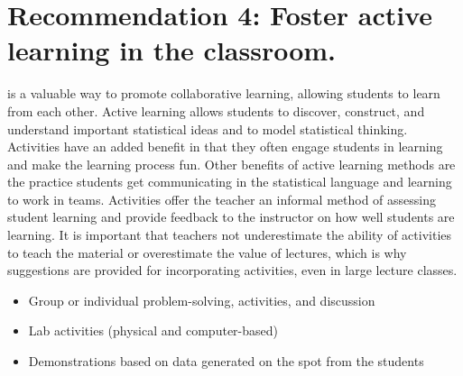 \section{\textbf{Recommendation 4: Foster active learning in the classroom.}}
 
 is a valuable way to promote collaborative learning, allowing students to learn from each other. Active learning allows students to discover, construct, and understand important statistical ideas and to model statistical thinking. Activities have an added benefit in that they often engage students in learning and make the learning process fun.  Other benefits of active learning methods are the practice students get communicating in the statistical language and learning to work in teams. Activities offer the teacher an informal method of assessing student learning and provide feedback to the instructor on how well students are learning. It is important that teachers not underestimate the ability of activities to teach the material or overestimate the value of lectures, which is why suggestions are provided for incorporating activities, even in large lecture classes.  \\
\vspace{.25in}
 
\noindent{}

\renewcommand\labelitemi{$\filledsquare$}

\begin{itemize}[leftmargin=1cm, itemsep=.2em]
\item Group or individual problem-solving, activities, and discussion
\item Lab activities (physical and computer-based)
\item Demonstrations based on data generated on the spot from the students
\end{itemize}
 
\renewcommand\labelitemi{$\checkmark$}

